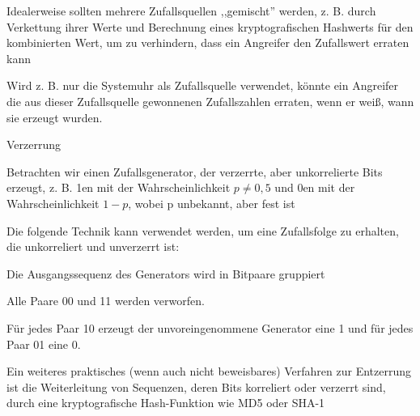 \documentclass[a4paper]{article}
\begin{document}
\begin{multicols}{3}
\begin{itemize*}
            \item Idealerweise sollten mehrere Zufallsquellen ,,gemischt'' werden, z. B. durch Verkettung ihrer Werte und Berechnung eines kryptografischen Hashwerts für den kombinierten Wert, um zu verhindern, dass ein Angreifer den Zufallswert erraten kann
            \begin{itemize*}
                  \item Wird z. B. nur die Systemuhr als Zufallsquelle verwendet, könnte ein Angreifer die aus dieser Zufallsquelle gewonnenen Zufallszahlen erraten, wenn er weiß, wann sie erzeugt wurden.
            \end{itemize*}
            \item Verzerrung
            \begin{itemize*}
                  \item Betrachten wir einen Zufallsgenerator, der verzerrte, aber unkorrelierte Bits erzeugt, z. B. 1en mit der Wahrscheinlichkeit $p\not= 0,5$ und 0en mit der Wahrscheinlichkeit $1-p$, wobei p unbekannt, aber fest ist
            \end{itemize*}
            \item Die folgende Technik kann verwendet werden, um eine Zufallsfolge zu erhalten, die unkorreliert und unverzerrt ist:
            \begin{itemize*}
                  \item Die Ausgangssequenz des Generators wird in Bitpaare gruppiert
                  \item Alle Paare 00 und 11 werden verworfen.
                  \item Für jedes Paar 10 erzeugt der unvoreingenommene Generator eine 1 und für jedes Paar 01 eine 0.
            \end{itemize*}
            \item Ein weiteres praktisches (wenn auch nicht beweisbares) Verfahren zur Entzerrung ist die Weiterleitung von Sequenzen, deren Bits korreliert oder verzerrt sind, durch eine kryptografische Hash-Funktion wie MD5 oder SHA-1
      \end{itemize*}


\end{multicols}
\end{document}
